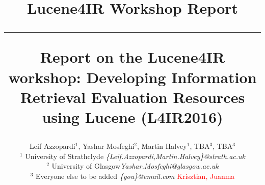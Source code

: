 \documentclass[12pt]{article}
\begin{document}
\title{\vspace{-2.5cm}
\begin{center}
\textbf{\small{Lucene4IR Workshop Report}}\\\vspace{-0.5cm} \rule{17.5cm}{1pt}
\end{center}
\vspace{1cm}\textbf{Report on the Lucene4IR workshop: Developing Information Retrieval Evaluation Resources using Lucene (L4IR2016) }}

\newcommand{\todo}[1]{\textcolor{red}{#1}}
\author{
Leif Azzopardi$^{1}$, Yashar Mosfeghi$^{2}$, Martin Halvey$^{1}$, TBA$^{3}$, TBA$^{3}$\\
    $^{1}$  University of Strathclyde  \emph{\small \{Leif.Azzopardi,Martin.Halvey\}@strath.ac.uk}\\
    $^{2}$ University of Glasgow\emph{\small Yashar.Mosfeghi@glasgow.ac.uk}\\
    $^{3}$ Everyone else to be added \emph{\small \{you\}@email.com}
    \todo{Krisztian, Juanma}
}
\end{document}
